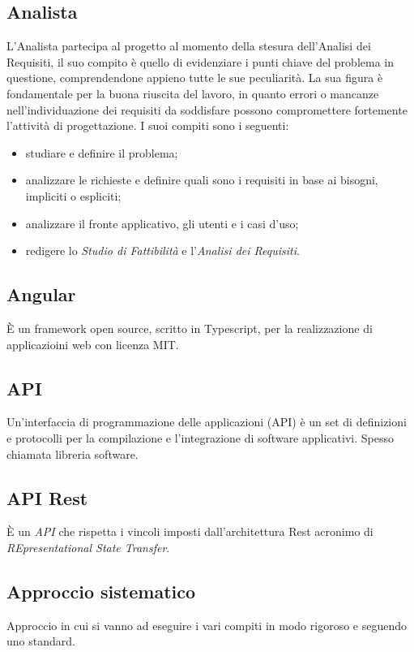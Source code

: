 \subsection*{Analista} L’Analista partecipa al progetto al momento della stesura dell’Analisi dei Requisiti, il suo compito è quello di evidenziare i punti chiave del problema in questione, comprendendone appieno tutte le sue peculiarità. La sua figura è fondamentale per la buona riuscita del lavoro, in quanto errori o mancanze nell’individuazione dei requisiti da soddisfare possono compromettere fortemente l’attività di progettazione. I suoi compiti sono i seguenti:
\begin{itemize}
    \item studiare e definire il problema;
    \item analizzare le richieste e definire quali sono i requisiti in base ai bisogni, impliciti o espliciti;
    \item analizzare il fronte applicativo, gli utenti e i casi d’uso;
    \item redigere lo \textit{Studio di Fattibilità} e l’\textit{Analisi dei Requisiti}.
\end{itemize}

\subsection*{Angular} È un framework open source, scritto in Typescript, per la realizzazione di applicazioini web con licenza MIT.

\subsection*{API} Un'interfaccia di programmazione delle applicazioni (API) è un set di definizioni e protocolli per la compilazione e l'integrazione di software applicativi. Spesso chiamata libreria software.

\subsection*{API Rest} È un \textit{API} che rispetta i vincoli imposti dall'architettura Rest acronimo di \textit{REpresentational State Transfer}.

\subsection*{Approccio sistematico} Approccio in cui si vanno ad eseguire i vari compiti in modo rigoroso e seguendo uno standard.

